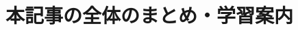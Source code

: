 \documentclass[
		head_space=20mm,
		foot_space=20mm,
		gutter=10mm,
		line_length=190mm
]{jlreq}
\begin{document}

\clearpage




\clearpage

\section{本記事の全体のまとめ・学習案内}



\clearpage
\end{document}
